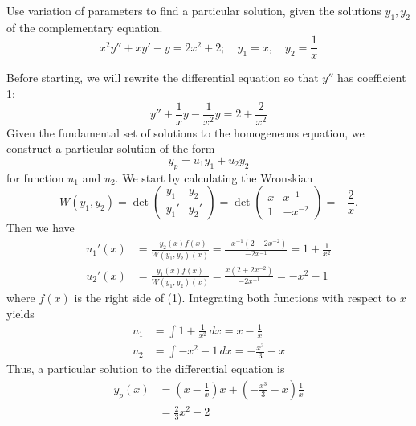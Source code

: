 \documentclass[11pt, titlepage]{article}
\begin{document}
    \pagebreak


    \begin{problem}[Trench 5.7.7]
        Use variation of parameters to find a particular solution, given the
        solutions $y_1, y_2$ of the complementary equation.
        \[
        x^2 y'' + xy' - y = 2 x^2 + 2; \quad y_1 = x, \quad y_2 = \frac{1}{x}
        \] 
    \end{problem}

    \begin{solution}
        Before starting, we will rewrite the differential equation so that
        $y''$ has coefficient 1:
        \begin{equation}
            y'' + \frac{1}{x}y - \frac{1}{x^2}y = 2 + \frac{2}{x^2}
        \end{equation}
        Given the fundamental set of solutions to the homogeneous equation, we
        construct a particular solution of the form
        \[
        y_p = u_1 y_1 + u_2 y_2
        \] 
        for function $u_1$ and $u_2$. We start by calculating the Wronskian
        \[
            W(y_1, y_2) = \det
            \begin{pmatrix}
                y_1 & y_2 \\
                y_1' & y_2'
            \end{pmatrix} = \det
            \begin{pmatrix}
                x & x^{-1} \\
                1 & -x^{-2}
            \end{pmatrix} = 
            -\frac{2}{x}.
        \] 
        Then we have  
        \begin{align*}
            u_1'(x) &= \frac{-y_2(x) f(x)}{W(y_1, y_2)(x)} =
            \frac{-x^{-1}(2+2x^{-2})}{-2x^{-1}} = 1 + \frac{1}{x^2} \\
            u_2'(x) &= \frac{y_1(x) f(x)}{W(y_1, y_2)(x)} = \frac{x
            (2+2x^{-2})}{-2x^{-1}} = -x^2 - 1
        \end{align*}
        where $f(x)$ is the right side of (1).
        Integrating both functions with respect to $x$ yields
        \begin{align*}
            u_1 &= \int 1 + \frac{1}{x^2} \, dx = x - \frac{1}{x} \\
            u_2 &= \int -x^2 - 1 \, dx = - \frac{x^{3}}{3} - x
        \end{align*}
        Thus, a particular solution to the differential equation is
        \begin{align*}
            y_p(x) &= \left(x - \frac{1}{x} \right) x + \left( - \frac{x^3}{3} -
            x \right) \frac{1}{x} \\
                   &= \frac{2}{3} x^2 - 2
        \end{align*}
    \end{solution}
    \pagebreak
\end{document}
